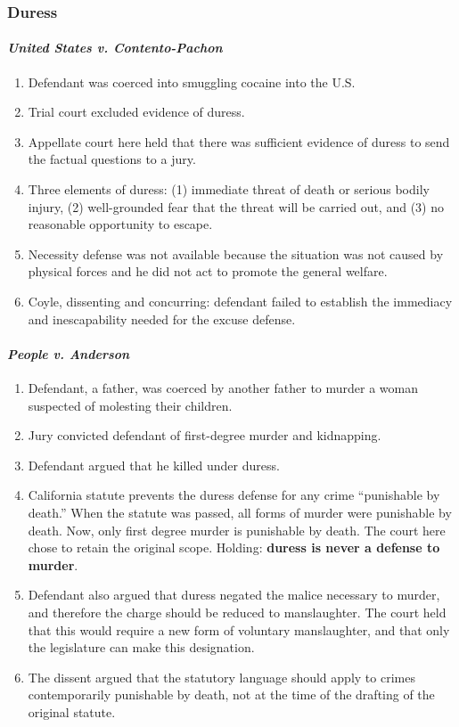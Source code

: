 \subsubsection{Duress}

\paragraph{\emph{United States v. Contento-Pachon}}

\begin{enumerate}
    \item Defendant was coerced into smuggling cocaine into the U.S.
    \item Trial court excluded evidence of duress.
    \item Appellate court here held that there was sufficient evidence of duress to send the factual questions to a jury.
    \item Three elements of duress: (1) immediate threat of death or serious bodily injury, (2) well-grounded fear that the threat will be carried out, and (3) no reasonable opportunity to escape.
    \item Necessity defense was not available because the situation was not caused by physical forces and he did not act to promote the general welfare.
    \item Coyle, dissenting and concurring: defendant failed to establish the immediacy and inescapability needed for the excuse defense.
\end{enumerate}

\paragraph{\emph{People v. Anderson}}

\begin{enumerate}
    \item Defendant, a father, was coerced by another father to murder a woman suspected of molesting their children.
    \item Jury convicted defendant of first-degree murder and kidnapping.
    \item Defendant argued that he killed under duress.
    \item California statute prevents the duress defense for any crime ``punishable by death.'' When the statute was passed, all forms of murder were punishable by death. Now, only first degree murder is punishable by death. The court here chose to retain the original scope. Holding: \textbf{duress is never a defense to murder}.
    \item Defendant also argued that duress negated the malice necessary to murder, and therefore the charge should be reduced to manslaughter. The court held that this would require a new form of voluntary manslaughter, and that only the legislature can make this designation.
    \item The dissent argued that the statutory language should apply to crimes contemporarily punishable by death, not at the time of the drafting of the original statute.
\end{enumerate}

